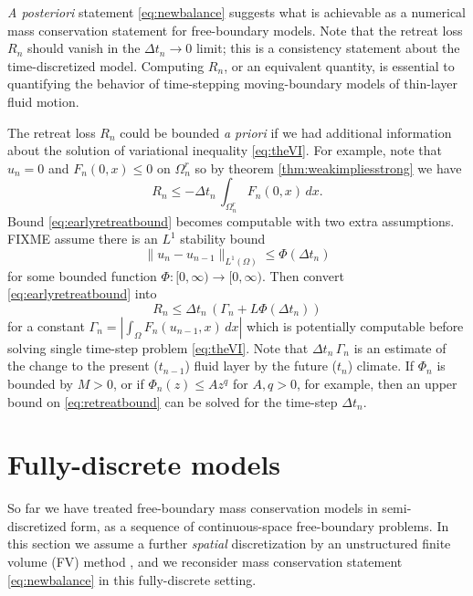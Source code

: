 \documentclass[final,onefignum]{siamart190516}
\begin{document}
\emph{A posteriori} statement \eqref{eq:newbalance} suggests what is achievable as a numerical mass conservation statement for free-boundary models.  Note that the retreat loss $R_n$ should vanish in the $\Delta t_n\to 0$ limit; this is a consistency statement about the time-discretized model.  Computing $R_n$, or an equivalent quantity, is essential to quantifying the behavior of time-stepping moving-boundary models of thin-layer fluid motion.

The retreat loss $R_n$ could be bounded \emph{a priori} if we had additional information about the solution of variational inequality \eqref{eq:theVI}.  For example, note that $u_n=0$ and $F_n(0,x)\le 0$ on $\Omega_n^r$ so by theorem \ref{thm:weakimpliesstrong} we have
\begin{equation}
R_n \le - \Delta t_n\,\int_{\Omega_n^r} F_n(0,x)\,dx.  \label{eq:earlyretreatbound}
\end{equation}
Bound \eqref{eq:earlyretreatbound} becomes computable with two extra assumptions.  FIXME assume there is an $L^1$ stability bound
\begin{equation}
\|u_n-u_{n-1}\|_{L^1(\Omega)} \le \Phi(\Delta t_n)
\end{equation}
for some bounded function $\Phi : [0,\infty) \to [0,\infty)$.  Then convert \eqref{eq:earlyretreatbound} into
\begin{equation}
R_n \le \Delta t_n\,\left(\Gamma_n + L \Phi(\Delta t_n)\right)   \label{eq:retreatbound}
\end{equation}
for a constant $\Gamma_n=\left|\int_{\Omega} F_n(u_{n-1},x)\,dx\right|$ which is potentially computable before solving single time-step problem \eqref{eq:theVI}.  Note that $\Delta t_n\,\Gamma_n$ is an estimate of the change to the present ($t_{n-1}$) fluid layer by the future ($t_n$) climate.  If $\Phi_n$ is bounded by $M>0$, or if $\Phi_n(z) \le A z^q$ for $A,q>0$, for example, then an upper bound on \eqref{eq:retreatbound} can be solved for the time-step $\Delta t_n$.


\section{Fully-discrete models}  \label{sec:spacediscretized}

So far we have treated free-boundary mass conservation models in semi-discretized form, as a sequence of continuous-space free-boundary problems.  In this section we assume a further \emph{spatial} discretization by an unstructured finite volume (FV) method \cite{LeVeque2002}, and we reconsider mass conservation statement \eqref{eq:newbalance} in this fully-discrete setting.
\end{document}
